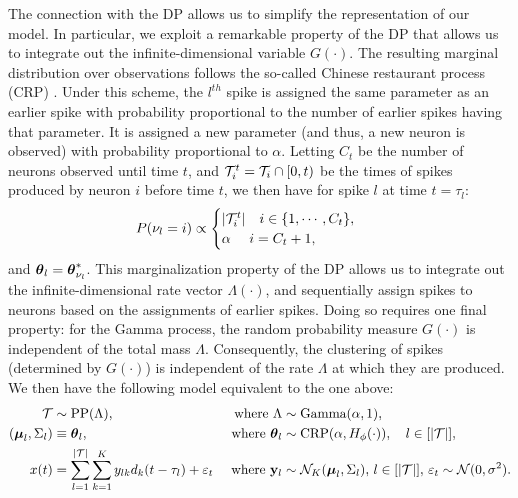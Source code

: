 The connection with the DP allows us to simplify the representation of our model. In particular, we exploit a remarkable property of the DP that
allows us to integrate out the infinite-dimensional variable $G(\cdot)$. The resulting marginal distribution over observations follows the so-called
 Chinese restaurant process (CRP) \citep{Pit2002a}. Under this scheme, the $l^{th}$ spike is assigned the same parameter as an earlier spike with probability 
proportional to the number of earlier spikes having that parameter. It is assigned a new parameter (and thus, a new neuron is observed) with probability 
proportional to $\alpha$. Letting $C_t$ be the number of neurons observed until time $t$, and  $\mathcal{T}^t_i = \mathcal{T}_i \cap [0,t)$ be the times of spikes 
produced by neuron $i$ before time $t$,
we then have for spike $l$ at time $t = \tau_l$: 
\vspace{-.06in}
\begin{align}
  P({\nu_l} = i) & \propto 
  \begin{cases}
   |\mathcal{T}^t_i| \quad i \in \{1,\cdots, C_{t}\}, \\
   \alpha \quad\ i = C_{t} + 1, 
  \end{cases}  
\label{eq:crp_marg_pr}
\end{align}
and $\boldsymbol{\theta}_l = \boldsymbol{\theta}^*_{\nu_l}$. 
This marginalization property of the DP allows us to integrate out the infinite-dimensional rate vector $\Lambda(\cdot)$, and sequentially 
assign spikes to neurons based on the assignments of earlier spikes.
Doing so requires one final property: for the Gamma process, the random probability measure $G(\cdot)$ is independent of the total mass $\Lambda$. 
Consequently, the clustering of spikes (determined by $G(\cdot)$) is independent of the rate $\Lambda$ at which they are produced. We then have
 the following model equivalent to the one above:
\begin{subequations}
\begin{align}
  \mathcal{T} &\sim \text{PP}(\Lambda), \qquad &\text{ where } \Lambda  &\sim \text{Gamma}(\alpha, 1),
   \\
   (\boldsymbol{\mu}_{l}, \Sigma_{l}) &\equiv \boldsymbol{\theta}_l,  &\text{ where } \boldsymbol{\theta}_l &\sim \text{CRP}(\alpha, H_{\phi}(\cdot)), \quad l \in [|\mathcal{T}|],   \label{eq:CRP}\\
  x(t) &=   \sum_{l=1}^{|\mathcal{T}|} \sum_{k=1}^K y_{lk} d_k(t - \tau_{l}) + \varepsilon_t  &\text{ where } \mathbf{y}_l &\sim \mathcal{N}_K(\boldsymbol{\mu}_{l}, \Sigma_{l}), \,  l \in [|\mathcal{T}|], \, \varepsilon_t \sim \mathcal{N}(0,\sigma^2).   \label{eq:CRP_mix}
\end{align}
\end{subequations}
